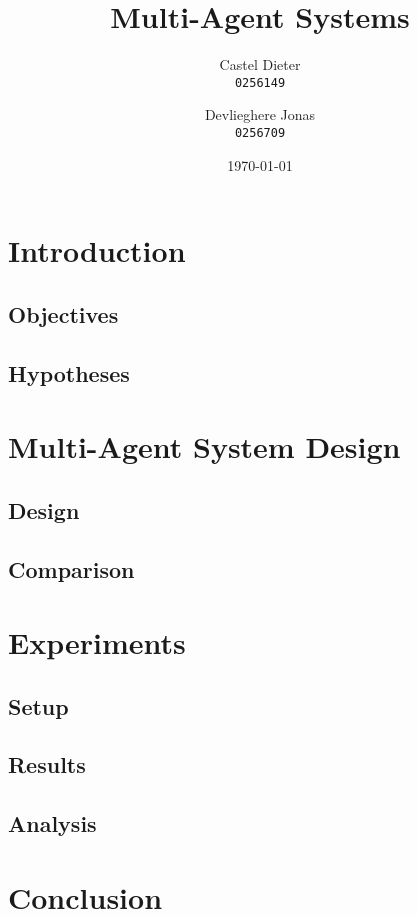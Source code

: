 \documentclass[11pt,a4paper,oneside]{article}
\title{Multi-Agent Systems}
\author{
  Castel Dieter\\
  \texttt{0256149}
  \and
  Devlieghere Jonas\\
  \texttt{0256709}
}
\date{\today}
\begin{document}
\maketitle
\tableofcontents
\listoffigures
\listoftables
\newpage

\section{Introduction}


\subsection{Objectives}


\subsection{Hypotheses}


\section{Multi-Agent System Design}

\subsection{Design}


\subsection{Comparison}


\section{Experiments}

\subsection{Setup}


\subsection{Results}


\subsection{Analysis}


\section{Conclusion}


\newpage


\nocite{*}
\end{document}
